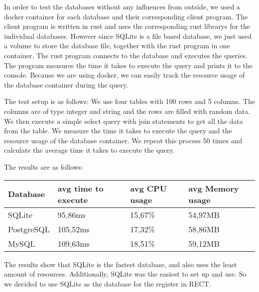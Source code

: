 In order to test the databases without any influences from outside, we used a docker container for each database and their corresponding client program. The client program
is written in rust and uses the corresponding rust librarys for the individual databases. However since SQLite is a file based database, we just used a volume to store the
database file, together with the rust program in one container. The rust program connects to the database and executes the queries. The program measures the time it 
takes to execute the query and prints it to the console. Because we are using docker, we can easily track the resource usage of the database container during the query.\newline

The test setup is as follows: We use four tables with 100 rows and 5 columns. The columns are of type integer and string and the rows are filled with random data. We then 
execute a simple select query with join statements to get all the data from the table. We measure the time it takes to execute the query and the resource usage of the database 
container. We repeat this process 50 times and calculate the average time it takes to execute the query.\newline

The results are as follows:
\begin{center}
    \begin{tabular}{ | m{3cm} | m{4cm}| m{4cm} | m{4cm} | } 
      \hline
      Database & avg time to execute & avg CPU usage & avg Memory usage \\ 
      \hline
      SQLite & 95,86ms & 15,67\% & 54,97MB \\ 
      \hline
      PostgreSQL & 105,52ms & 17,32\% & 58,86MB \\ 
      \hline
      MySQL & 109,63ms & 18,51\% & 59,12MB \\
      \hline
    \end{tabular}
\end{center}

The results show that SQLite is the fastest database, and also uses the least amount of resources. Additionally, SQLite was the easiest to set up and use. So we decided to use
SQLite as the database for the register in RECT.

\filbreak
